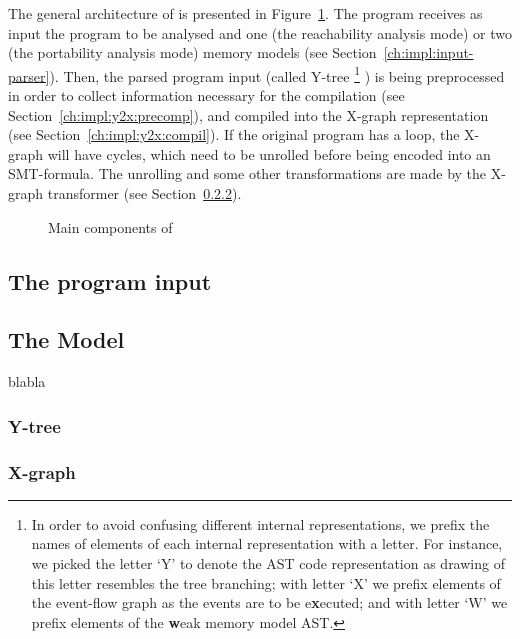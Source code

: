 The general architecture of \porthos[2] is presented in Figure~\ref{fig:program-components}.
The program receives as input the program to be analysed and one (the reachability analysis mode) or two (the portability analysis mode) memory models (see Section~\ref{ch:impl:input-parser}).
Then, the parsed program input (called Y-tree%
\footnote{In order to avoid confusing different internal representations, we prefix the names of elements of each internal representation with a letter. For instance, we picked the letter `Y' to denote the AST code representation as drawing of this letter resembles the tree branching; with letter `X' we prefix elements of the event-flow graph as the events are to be e\textbf{x}ecuted; and with letter `W' we prefix elements of the \textbf{w}eak memory model AST.}%
) is being preprocessed in order to collect information necessary for the compilation (see Section~\ref{ch:impl:y2x:precomp}), and compiled into the X-graph representation (see Section~\ref{ch:impl:y2x:compil}).
If the original program has a loop, the X-graph will have cycles, which need to be unrolled before being encoded into an SMT-formula. The unrolling and some other transformations are made by the X-graph transformer (see Section~\ref{}).

\begin{figure}%
  \centering
  \caption{Main components of \porthos[2]}
  \label{fig:program-components}
\end{figure}


\subsection{The program input}



\subsection{The Model}

blabla

\subsubsection{Y-tree}

\subsubsection{X-graph}

